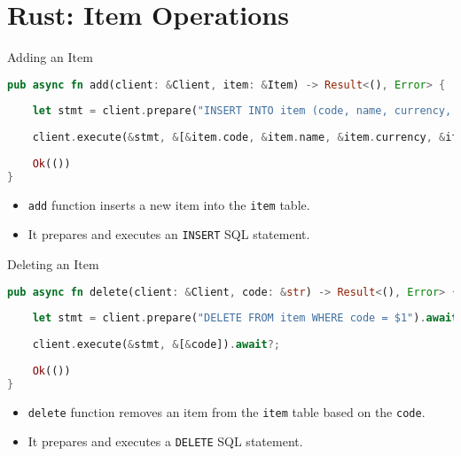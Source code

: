 \documentclass[aspectratio=169, table]{beamer}
\begin{document}
\section{Rust: Item Operations}
\begin{frame}[fragile]{Adding an Item}
\vspace{15pt}
\begin{lstlisting}[language=Rust]
pub async fn add(client: &Client, item: &Item) -> Result<(), Error> {
	
	let stmt = client.prepare("INSERT INTO item (code, name, currency, price, quantity, unit) VALUES ($1, $2, $3, $4, $5, $6)",).await?;
	
	client.execute(&stmt, &[&item.code, &item.name, &item.currency, &item.price, &item.quantity, &item.unit,],).await?;
	
	Ok(())
}
\end{lstlisting}

\begin{itemize}
\item \texttt{add} function inserts a new item into the \texttt{item} table.
\item It prepares and executes an \texttt{INSERT} SQL statement.
\end{itemize}
\end{frame}

\begin{frame}[fragile]{Deleting an Item}
\vspace{15pt}
\begin{lstlisting}[language=Rust]
pub async fn delete(client: &Client, code: &str) -> Result<(), Error> {
	
	let stmt = client.prepare("DELETE FROM item WHERE code = $1").await?;
	
	client.execute(&stmt, &[&code]).await?;
	
	Ok(())
}
\end{lstlisting}

\begin{itemize}
\item \texttt{delete} function removes an item from the \texttt{item} table based on the \texttt{code}.
\item It prepares and executes a \texttt{DELETE} SQL statement.
\end{itemize}
\end{frame}
\end{document}
